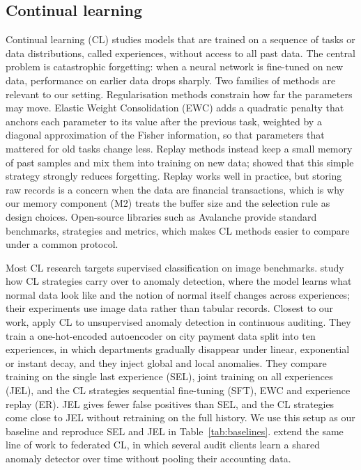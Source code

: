 \documentclass{article} %
\begin{document}
\subsection{Continual learning}\label{sec:related-cl}
Continual learning (CL) studies models that are trained on a sequence of
tasks or data distributions, called experiences, without access to all past
data. The central problem is catastrophic forgetting: when a neural network is
fine-tuned on new data, performance on earlier data drops sharply. Two families
of methods are relevant to our setting. Regularisation methods constrain how
far the parameters may move. Elastic Weight Consolidation (EWC)
\citep{kirkpatrick2017overcoming} adds a quadratic penalty that anchors each
parameter to its value after the previous task, weighted by a diagonal
approximation of the Fisher information, so that parameters that mattered for
old tasks change less. Replay methods instead keep a small memory of past
samples and mix them into training on new data; \citet{rolnick2019experience}
showed that this simple strategy strongly reduces forgetting. Replay works well
in practice, but storing raw records is a concern when the data are financial
transactions, which is why our memory component (M2) treats the buffer size and
the selection rule as design choices. Open-source libraries such as Avalanche
\citep{lomonaco2021avalanche} provide standard benchmarks, strategies and
metrics, which makes CL methods easier to compare under a common protocol.

Most CL research targets supervised classification on image benchmarks.
\citet{pezze2022continual} study how CL strategies carry over to anomaly
detection, where the model learns what normal data look like and the notion of
normal itself changes across experiences; their experiments use image data
rather than tabular records. Closest to our work, \citet{hemati2022continual}
apply CL to unsupervised anomaly detection in continuous auditing. They train a
one-hot-encoded autoencoder on city payment data split into ten experiences, in
which departments gradually disappear under linear, exponential or instant
decay, and they inject global and local anomalies. They compare training on
the single last experience (SEL), joint training on all experiences (JEL), and
the CL strategies sequential fine-tuning (SFT), EWC and experience replay (ER).
JEL gives fewer false positives than SEL, and the CL strategies come close to
JEL without retraining on the full history. We use this setup as our baseline
and reproduce SEL and JEL in Table~\ref{tab:baselines}.
\citet{schreyer2022federated} extend the same line of work to federated CL, in
which several audit clients learn a shared anomaly detector over time without
pooling their accounting data.
\end{document}
